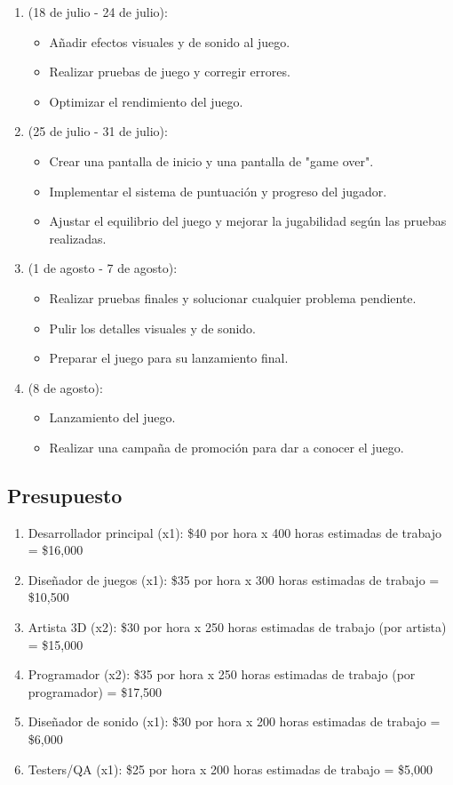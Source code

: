 \begin{enumerate}[label=Semana \arabic*:, align=left, leftmargin=*]
\item (18 de julio - 24 de julio):
\begin{itemize}[label=--]
	\item Añadir efectos visuales y de sonido al juego.
	\item Realizar pruebas de juego y corregir errores.
	\item Optimizar el rendimiento del juego.
\end{itemize}

\item (25 de julio - 31 de julio):
\begin{itemize}[label=--]
	\item Crear una pantalla de inicio y una pantalla de "game over".
	\item Implementar el sistema de puntuación y progreso del jugador.
	\item Ajustar el equilibrio del juego y mejorar la jugabilidad según las pruebas realizadas.
\end{itemize}

\item (1 de agosto - 7 de agosto):
\begin{itemize}[label=--]
	\item Realizar pruebas finales y solucionar cualquier problema pendiente.
	\item Pulir los detalles visuales y de sonido.
	\item Preparar el juego para su lanzamiento final.
\end{itemize}

\item (8 de agosto):
\begin{itemize}[label=--]
	\item Lanzamiento del juego.
	\item Realizar una campaña de promoción para dar a conocer el juego.
\end{itemize}
\end {enumerate}

\subsection{Presupuesto}
\begin{enumerate}
	\item Desarrollador principal (x1): \$40 por hora x 400 horas estimadas de trabajo = \$16,000
	\item Diseñador de juegos (x1): \$35 por hora x 300 horas estimadas de trabajo = \$10,500
	\item Artista 3D (x2): \$30 por hora x 250 horas estimadas de trabajo (por artista) = \$15,000
	\item Programador (x2): \$35 por hora x 250 horas estimadas de trabajo (por programador) = \$17,500
	\item Diseñador de sonido (x1): \$30 por hora x 200 horas estimadas de trabajo = \$6,000
	\item Testers/QA (x1): \$25 por hora x 200 horas estimadas de trabajo = \$5,000
\end{enumerate}

